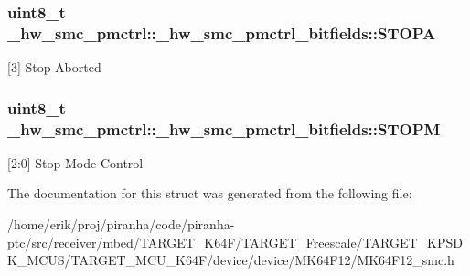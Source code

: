 \subsubsection[{\texorpdfstring{S\+T\+O\+PA}{STOPA}}]{\setlength{\rightskip}{0pt plus 5cm}uint8\+\_\+t \+\_\+hw\+\_\+smc\+\_\+pmctrl\+::\+\_\+hw\+\_\+smc\+\_\+pmctrl\+\_\+bitfields\+::\+S\+T\+O\+PA}\hypertarget{struct__hw__smc__pmctrl_1_1__hw__smc__pmctrl__bitfields_acb42326897bfb7a398f4b2c2ff43565d}{}\label{struct__hw__smc__pmctrl_1_1__hw__smc__pmctrl__bitfields_acb42326897bfb7a398f4b2c2ff43565d}
\mbox{[}3\mbox{]} Stop Aborted 
\subsubsection[{\texorpdfstring{S\+T\+O\+PM}{STOPM}}]{\setlength{\rightskip}{0pt plus 5cm}uint8\+\_\+t \+\_\+hw\+\_\+smc\+\_\+pmctrl\+::\+\_\+hw\+\_\+smc\+\_\+pmctrl\+\_\+bitfields\+::\+S\+T\+O\+PM}\hypertarget{struct__hw__smc__pmctrl_1_1__hw__smc__pmctrl__bitfields_a32cb42c3b1bd5789e1281d546c90c8aa}{}\label{struct__hw__smc__pmctrl_1_1__hw__smc__pmctrl__bitfields_a32cb42c3b1bd5789e1281d546c90c8aa}
\mbox{[}2\+:0\mbox{]} Stop Mode Control 

The documentation for this struct was generated from the following file\+:\begin{DoxyCompactItemize}
\item 
/home/erik/proj/piranha/code/piranha-\/ptc/src/receiver/mbed/\+T\+A\+R\+G\+E\+T\+\_\+\+K64\+F/\+T\+A\+R\+G\+E\+T\+\_\+\+Freescale/\+T\+A\+R\+G\+E\+T\+\_\+\+K\+P\+S\+D\+K\+\_\+\+M\+C\+U\+S/\+T\+A\+R\+G\+E\+T\+\_\+\+M\+C\+U\+\_\+\+K64\+F/device/device/\+M\+K64\+F12/M\+K64\+F12\+\_\+smc.\+h\end{DoxyCompactItemize}
